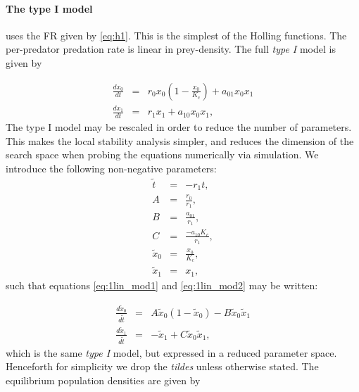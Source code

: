 \paragraph*{The type I model} uses the FR given by \eqref{eq:h1}. This is the simplest of the Holling functions. The per-predator predation rate is linear in prey-density. The full \emph{type I} model is given by

\begin{eqnarray}
\frac{dx_{0}}{dt} &=& r_0x_0\left(1-\frac{x_0}{K_c}\right) + a_{01}x_0x_1 \label{eq:1lin_mod1} \\[10pt]
\frac{dx_{1}}{dt} &=& r_1x_1 + a_{10}x_0x_1 \label{eq:1lin_mod2}, 
\end{eqnarray}
%
The type I model may be rescaled in order to reduce the number of parameters. This makes the local stability analysis simpler, and reduces the dimension of the search space when probing the equations numerically via simulation. We introduce the following non-negative parameters:
\begin{eqnarray}
\tilde{t} &=& -r_1 t, \\[10pt]
A &=& \frac{r_0}{r_1}, \\[10pt]
B &=& \frac{a_{01}}{r_1}, \\[10pt]
C &=& \frac{-a_{10}K_c}{r_1}, \\[10pt]
\tilde{x}_0 &=& \frac{x_0}{K_c}, \\[10pt]
\tilde{x}_1 &=& x_1,
\end{eqnarray}
%
such that equations \eqref{eq:1lin_mod1} and \eqref{eq:1lin_mod2} may be written:

\begin{eqnarray}
\frac{d\tilde{x}_{0}}{d\tilde{t}} &=& A\tilde{x}_0(1-\tilde{x}_0) - B\tilde{x}_0\tilde{x}_1 \label{eq:lin_mod1} \\[10pt]
\frac{d\tilde{x}_{1}}{d\tilde{t}} &=& -\tilde{x}_1 + C\tilde{x}_0\tilde{x}_1 \label{eq:lin_mod2}, 
\end{eqnarray}
%
which is the same \emph{type I} model, but expressed in a reduced parameter space. Henceforth for simplicity we drop the \emph{tildes} unless otherwise stated. The equilibrium population densities are given by

